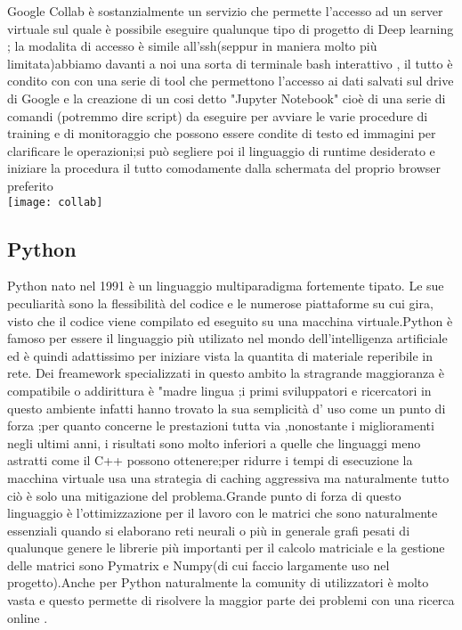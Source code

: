 Google Collab è sostanzialmente un servizio che permette l'accesso ad un server virtuale sul quale è possibile eseguire qualunque tipo di progetto di Deep learning  ; la modalita di accesso è simile all'ssh(seppur in maniera  molto più limitata)abbiamo davanti a noi una sorta di terminale bash interattivo ,  il tutto è condito con con una serie di tool che permettono l'accesso ai dati salvati sul drive di Google  e la creazione di un cosi detto "Jupyter Notebook" cioè di una serie di comandi (potremmo dire script) da eseguire per avviare le varie procedure di training e di monitoraggio  che possono essere condite di testo ed immagini per clarificare le operazioni;si può segliere poi il linguaggio di runtime desiderato e iniziare la procedura il tutto comodamente dalla schermata del proprio browser preferito \\
\texttt{[image: collab]}



\subsection{Python}


Python nato nel 1991 è un linguaggio multiparadigma fortemente tipato. 
Le sue peculiarità sono la flessibilità del codice e le numerose piattaforme su cui gira, visto che il codice viene compilato ed eseguito su una macchina virtuale.Python è famoso per essere il linguaggio più utilizato  nel mondo dell’intelligenza artificiale ed è quindi adattissimo per iniziare vista la quantita di materiale reperibile in rete. Dei freamework  specializzati in questo ambito la stragrande maggioranza è compatibile o addirittura è "madre lingua ;i primi sviluppatori e ricercatori in questo ambiente infatti hanno trovato la sua semplicità d' uso come un punto di forza ;per quanto concerne le prestazioni tutta via ,nonostante i miglioramenti negli ultimi anni, i risultati sono molto inferiori a quelle che linguaggi meno astratti come il C++ possono ottenere;per ridurre i tempi di esecuzione la macchina virtuale usa una strategia di caching aggressiva ma naturalmente tutto ciò è solo una mitigazione del problema.Grande punto di forza di questo linguaggio è l'ottimizzazione per il lavoro con le matrici che sono naturalmente essenziali quando si elaborano reti neurali o più in generale grafi pesati di qualunque genere le librerie più importanti per il calcolo matriciale e la gestione delle matrici sono Pymatrix e Numpy(di cui faccio largamente uso nel progetto).Anche per Python naturalmente la comunity di utilizzatori è molto vasta e questo permette di risolvere la maggior parte dei problemi con una ricerca online .


